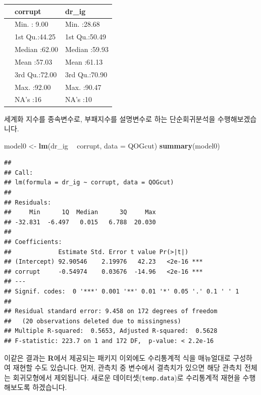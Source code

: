 \documentclass[]{book}
\newenvironment{Shaded}{\begin{snugshade}}{\end{snugshade}}
\newcommand{\CommentTok}[1]{\textcolor[rgb]{0.56,0.35,0.01}{\textit{#1}}}
\newcommand{\DataTypeTok}[1]{\textcolor[rgb]{0.13,0.29,0.53}{#1}}
\newcommand{\KeywordTok}[1]{\textcolor[rgb]{0.13,0.29,0.53}{\textbf{#1}}}
\newcommand{\NormalTok}[1]{#1}
\newcommand{\OperatorTok}[1]{\textcolor[rgb]{0.81,0.36,0.00}{\textbf{#1}}}
\newcommand{\StringTok}[1]{\textcolor[rgb]{0.31,0.60,0.02}{#1}}
\begin{document}
\begin{tabular}{l|l|l}
\hline
  &    corrupt &     dr\_ig\\
\hline
 & Min.   : 9.00 & Min.   :28.68\\
\hline
 & 1st Qu.:44.25 & 1st Qu.:50.49\\
\hline
 & Median :62.00 & Median :59.93\\
\hline
 & Mean   :57.03 & Mean   :61.13\\
\hline
 & 3rd Qu.:72.00 & 3rd Qu.:70.90\\
\hline
 & Max.   :92.00 & Max.   :90.47\\
\hline
 & NA's   :16 & NA's   :10\\
\hline
\end{tabular}

세계화 지수를 종속변수로, 부패지수를 설명변수로 하는 단순회귀분석을 수행해보겠습니다.

\begin{Shaded}
\begin{Highlighting}[]
\NormalTok{model0 <-}\StringTok{ }\KeywordTok{lm}\NormalTok{(dr_ig }\OperatorTok{~}\StringTok{ }\NormalTok{corrupt, }\DataTypeTok{data =}\NormalTok{ QOGcut) }
\KeywordTok{summary}\NormalTok{(model0)}
\end{Highlighting}
\end{Shaded}

\begin{verbatim}
## 
## Call:
## lm(formula = dr_ig ~ corrupt, data = QOGcut)
## 
## Residuals:
##     Min      1Q  Median      3Q     Max 
## -32.831  -6.497   0.015   6.788  20.030 
## 
## Coefficients:
##             Estimate Std. Error t value Pr(>|t|)    
## (Intercept) 92.90546    2.19976   42.23   <2e-16 ***
## corrupt     -0.54974    0.03676  -14.96   <2e-16 ***
## ---
## Signif. codes:  0 '***' 0.001 '**' 0.01 '*' 0.05 '.' 0.1 ' ' 1
## 
## Residual standard error: 9.458 on 172 degrees of freedom
##   (20 observations deleted due to missingness)
## Multiple R-squared:  0.5653, Adjusted R-squared:  0.5628 
## F-statistic: 223.7 on 1 and 172 DF,  p-value: < 2.2e-16
\end{verbatim}

이같은 결과는 \textbf{R}에서 제공되는 패키지 이외에도 수리통계적 식을 매뉴얼대로 구성하여 재현할 수도 있습니다. 먼저, 관측치 중 변수에서 결측치가 있으면 해당 관측치 전체는 회귀모형에서 제외됩니다. 새로운 데이터셋(\texttt{temp.data})로 수리통계적 재현을 수행해보도록 하겠습니다.

\begin{Shaded}
\end{Shaded}
\end{document}
